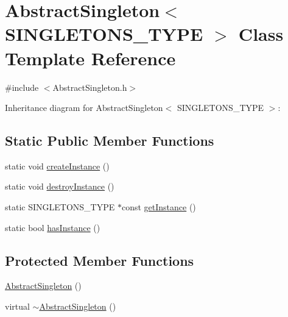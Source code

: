 \hypertarget{class_abstract_singleton}{\section{Abstract\+Singleton$<$ S\+I\+N\+G\+L\+E\+T\+O\+N\+S\+\_\+\+T\+Y\+P\+E $>$ Class Template Reference}
\label{class_abstract_singleton}
}


{\ttfamily \#include $<$Abstract\+Singleton.\+h$>$}



Inheritance diagram for Abstract\+Singleton$<$ S\+I\+N\+G\+L\+E\+T\+O\+N\+S\+\_\+\+T\+Y\+P\+E $>$\+:
\subsection*{Static Public Member Functions}
\begin{DoxyCompactItemize}
\item 
static void \hyperlink{class_abstract_singleton_adbd8a7b01d84c8faa51b4a289eff6da9}{create\+Instance} ()
\item 
static void \hyperlink{class_abstract_singleton_ac6ae218bcc99c7a2ed6f4254b7e944fb}{destroy\+Instance} ()
\item 
static S\+I\+N\+G\+L\+E\+T\+O\+N\+S\+\_\+\+T\+Y\+P\+E $\ast$const \hyperlink{class_abstract_singleton_a8c29cd35cdffd65edc0d898b7fe5782e}{get\+Instance} ()
\item 
static bool \hyperlink{class_abstract_singleton_a27cba711df9623867a810fb2248673eb}{has\+Instance} ()
\end{DoxyCompactItemize}
\subsection*{Protected Member Functions}
\begin{DoxyCompactItemize}
\item 
\hyperlink{class_abstract_singleton_a609aeeb806fb159e1bb8a8e616c01f87}{Abstract\+Singleton} ()
\item 
virtual \hyperlink{class_abstract_singleton_acc2f2a899840147e385d64496d52010b}{$\sim$\+Abstract\+Singleton} ()
\end{DoxyCompactItemize}


